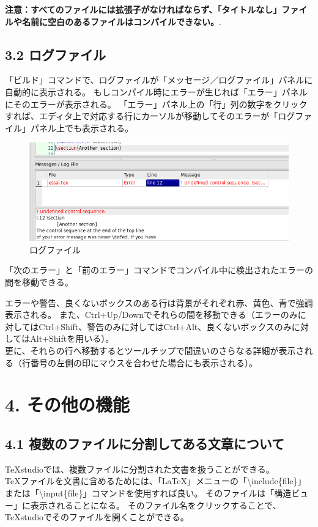 \documentclass[]{book}
\makeatletter
\def\maxwidth{\ifdim\Gin@nat@width>\linewidth\linewidth
\else\Gin@nat@width\fi}
\let\Oldincludegraphics\includegraphics
\renewcommand{\includegraphics}[1]{\Oldincludegraphics[width=\maxwidth]{#1}}
\makeatother
\begin{document}
\textbf{注意：すべてのファイルには拡張子がなければならず、「タイトルなし」ファイルや名前に空白のあるファイルはコンパイルできない。}.

\section{3.2 ログファイル}

「ビルド」コマンドで、ログファイルが「メッセージ／ログファイル」パネルに自動的に表示される。
もしコンパイル時にエラーが生じれば「エラー」パネルにそのエラーが表示される。
「エラー」パネル上の「行」列の数字をクリックすれば、エディタ上で対応する行にカーソルが移動してそのエラーが「ログファイル」パネル上でも表示される。

\begin{figure}[htbp]
\centering
\includegraphics{doc15.png}
\caption{ログファイル}
\end{figure}

「次のエラー」と「前のエラー」コマンドでコンパイル中に検出されたエラーの間を移動できる。

エラーや警告、良くないボックスのある行は背景がそれぞれ赤、黄色、青で強調表示される。
また、Ctrl+Up/Downでそれらの間を移動できる（エラーのみに対してはCtrl+Shift、警告のみに対してはCtrl+Alt、良くないボックスのみに対してはAlt+Shiftを用いる）。\\
更に、それらの行へ移動するとツールチップで間違いのさらなる詳細が表示される（行番号の左側の印にマウスを合わせた場合にも表示される）。

\chapter{4. その他の機能}

\section{4.1 複数のファイルに分割してある文章について}

TeXstudioでは、複数ファイルに分割された文書を扱うことができる。\\
TeXファイルを文書に含めるためには、「LaTeX」メニューの「\textbackslash{}include\{file\}」または「\textbackslash{}input\{file\}」コマンドを使用すれば良い。
そのファイルは「構造ビュー」に表示されることになる。
そのファイル名をクリックすることで、TeXstudioでそのファイルを開くことができる。
\end{document}
